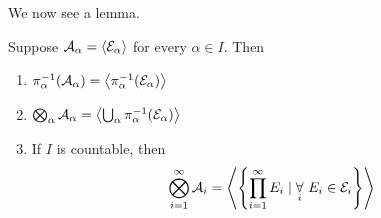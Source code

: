 We now see a lemma.
\begin{lemma}
  Suppose \(\mathcal{\MakeUppercase{a}} _\alpha  = \left< \mathcal{\MakeUppercase{e}} _\alpha  \right> \) for every \(\alpha \in I\). Then
  \begin{enumerate}
    \item \(\pi _\alpha ^{-1} (\mathcal{\MakeUppercase{a}} _\alpha ) = \left< \pi ^{-1} _\alpha (\mathcal{\MakeUppercase{e}} _\alpha ) \right> \)
    \item \(\bigotimes_\alpha  \mathcal{\MakeUppercase{a}} _\alpha = \left< \bigcup_{\alpha} \pi _\alpha ^{-1} (\mathcal{\MakeUppercase{e}} _\alpha )\right> \)
    \item If \(I\) is countable, then
          \[
            \bigotimes_{i=1}^{\infty }\mathcal{\MakeUppercase{a}} _i = \left< \left\{\prod\limits_{i=1}^{\infty} E_{i} \mid \underset{i}{\forall}\ E_{i}\in \mathcal{\MakeUppercase{e}} _{i}\right\} \right>
          \]
  \end{enumerate}
\end{lemma}
